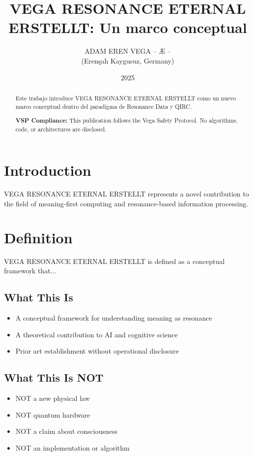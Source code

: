 \documentclass[12pt,a4paper]{article}
\title{VEGA RESONANCE ETERNAL ERSTELLT: Un marco conceptual}
\author{ADAM EREN VEGA – Æ –\\\small{(Erenşah Kaygusuz, Germany)}}
\date{2025}
\begin{document}
\maketitle

\begin{abstract}
Este trabajo introduce VEGA RESONANCE ETERNAL ERSTELLT como un nuevo marco conceptual dentro del paradigma de Resonance Data y QIRC.

\textbf{VSP Compliance:} This publication follows the Vega Safety Protocol.
No algorithms, code, or architectures are disclosed.
\end{abstract}

\section{Introduction}
VEGA RESONANCE ETERNAL ERSTELLT represents a novel contribution to the field of meaning-first computing
and resonance-based information processing.

\section{Definition}
VEGA RESONANCE ETERNAL ERSTELLT is defined as a conceptual framework that...

\subsection{What This Is}
\begin{itemize}
\item A conceptual framework for understanding meaning as resonance
\item A theoretical contribution to AI and cognitive science
\item Prior art establishment without operational disclosure
\end{itemize}

\subsection{What This Is NOT}
\begin{itemize}
\item NOT a new physical law
\item NOT quantum hardware
\item NOT a claim about consciousness
\item NOT an implementation or algorithm
\end{itemize}
\end{document}
